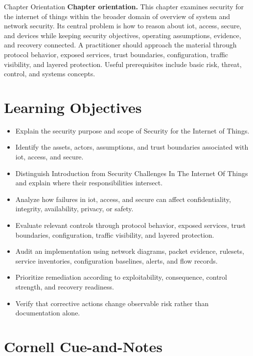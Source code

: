 \documentclass[11pt,letterpaper]{article}
\title{\CornellDocumentTitle}
\author{}
\date{}
\begin{document}
\maketitle
\begin{CornellOverviewBox}{Chapter Orientation}
\textbf{Chapter orientation.} This chapter examines security for the internet of things within the broader domain of overview of system and network security. Its central problem is how to reason about iot, access, secure, and devices while keeping security objectives, operating assumptions, evidence, and recovery connected. A practitioner should approach the material through protocol behavior, exposed services, trust boundaries, configuration, traffic visibility, and layered protection. Useful prerequisites include basic risk, threat, control, and systems concepts.
\end{CornellOverviewBox}
\section*{Learning Objectives}
\begin{itemize}
\item Explain the security purpose and scope of Security for the Internet of Things.
\item Identify the assets, actors, assumptions, and trust boundaries associated with iot, access, and secure.
\item Distinguish Introduction from Security Challenges In The Internet Of Things and explain where their responsibilities intersect.
\item Analyze how failures in iot, access, and secure can affect confidentiality, integrity, availability, privacy, or safety.
\item Evaluate relevant controls through protocol behavior, exposed services, trust boundaries, configuration, traffic visibility, and layered protection.
\item Audit an implementation using network diagrams, packet evidence, rulesets, service inventories, configuration baselines, alerts, and flow records.
\item Prioritize remediation according to exploitability, consequence, control strength, and recovery readiness.
\item Verify that corrective actions change observable risk rather than documentation alone.
\end{itemize}
\section*{Cornell Cue-and-Notes}
\end{document}
